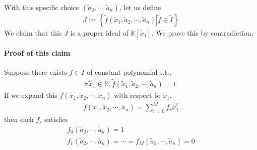\documentclass[11pt]{book}
\begin{document}
With this specific choice $(\tilde{a}_2, \cdots, \tilde{a}_n)$, let us define
\begin{eqnarray}
J := \left\{\left. \tilde{f}(\tilde{x}_1 , \tilde{a}_2, \cdots, \tilde{a}_n) \right| \tilde{f} \in \tilde{I} \right\}
\end{eqnarray}
We claim that this $J$ is a proper ideal of $\mathbb{K}[\tilde{x}_1]$.
We prove this by contradiction;

\paragraph{Proof of this claim}
Suppose there exists $\tilde{f} \in \tilde{I}$ of constant polynomial s.t.,
\begin{eqnarray}
\forall \tilde{x}_1 \in \mathbb{K}, \tilde{f}(\tilde{x}_1 , \tilde{a}_2, \cdots, \tilde{a}_n) = 1.
\end{eqnarray}
If we expand this $\tilde{f}(\tilde{x}_1 , \tilde{x}_2, \cdots, \tilde{x}_n)$ with respect to $\tilde{x}_1$,
\begin{eqnarray}
\tilde{f}(\tilde{x}_1 , \tilde{x}_2, \cdots, \tilde{x}_n)
=
\sum_{r=0}^M f_r \tilde{x}_1^r
\end{eqnarray}
then each $f_r$ satisfies
\begin{eqnarray}
f_0(\tilde{a}_2, \cdots, \tilde{a}_n) = 1 \\
f_1(\tilde{a}_2, \cdots, \tilde{a}_n) = \cdots = f_M(\tilde{a}_2, \cdots, \tilde{a}_n) = 0
\end{eqnarray}
\end{document}

